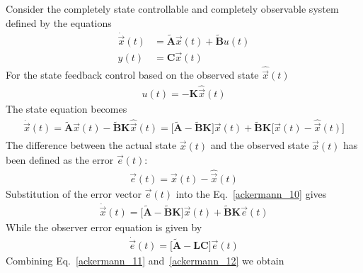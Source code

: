\documentclass[12pt,a4paper,oneside]{book}
\begin{document}
\begin{onehalfspace}
Consider the completely state controllable and completely observable system 
defined by the equations
\begin{equation*}
	\begin{split}
		\dot{\vec x}(t) & = \tilde{\mathbf{A}}\vec x(t) + 
		\tilde{\mathbf{B}}u(t) \\
		y(t) & = \mathbf{C}\vec x(t)
	\end{split}
\end{equation*} 
For the state feedback control based on the observed state $\hat{\vec x}(t)$ 
\begin{equation*}
	\begin{split}
		u(t)=-\mathbf{K}\hat{\vec x}(t)
	\end{split}
\end{equation*} 
The state equation becomes
\begin{equation} \label{ackermann_10}
	\begin{split}
		\dot{\vec x}(t)=\tilde{\mathbf{A}}\vec 
		x(t)-\tilde{\mathbf{B}}\mathbf{K}\hat{\vec x}(t) = 
		\Big[\tilde{\mathbf{A}}-\tilde{\mathbf{B}}\mathbf{K}\Big]\vec x(t) + 
		\tilde{\mathbf{B}}\mathbf{K}\Big[\vec x(t) - 
		\hat{\vec x}(t)\Big]
	\end{split}
\end{equation} 
The difference between the actual state $\vec x(t)$ and the observed state $\hat{\vec x}(t)$ has been defined as the error $\vec e(t)$:
\begin{equation*}
	\begin{split}
		\vec e(t)=\vec x(t) - \hat{\vec x}(t)
	\end{split}
\end{equation*} 
Substitution of the error vector $\vec e(t)$ into the Eq.~\eqref{ackermann_10} 
gives
\begin{equation} \label{ackermann_11}
	\begin{split}
		\dot{\vec x}(t) = 
		\Big[\tilde{\mathbf{A}}-\tilde{\mathbf{B}}\mathbf{K}\Big]\vec x(t) + 
		\tilde{\mathbf{B}}\mathbf{K}\vec{e}(t)
	\end{split}
\end{equation} 
While the observer error equation is given by
\begin{equation} \label{ackermann_12}
	\begin{split}
		\dot{\vec e}(t)= \Big[\tilde{\mathbf{A}}-\mathbf{LC}\Big]\vec e(t)
	\end{split}
\end{equation}
Combining Eq.~\eqref{ackermann_11} and~\eqref{ackermann_12} we obtain

\end{onehalfspace}
\end{document}
